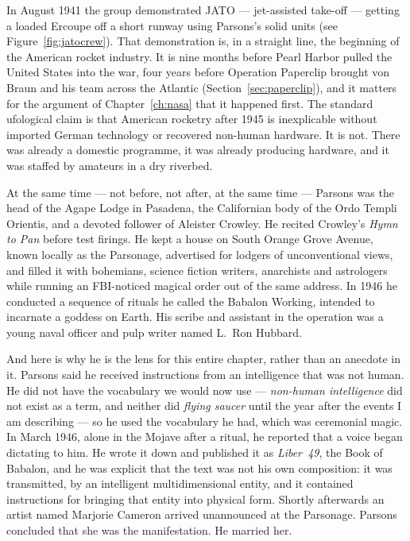 In August 1941 the group demonstrated JATO --- jet-assisted take-off --- getting a loaded Ercoupe
off a short runway using Parsons's solid units (see Figure~\ref{fig:jatocrew}). That demonstration is,
in a straight line, the beginning of the American rocket industry. It is nine months before Pearl
Harbor pulled the United States into the war, four years before Operation Paperclip brought von
Braun and his team across the Atlantic (Section~\ref{sec:paperclip}), and it matters for the argument
of Chapter~\ref{ch:nasa} that it happened first. The standard ufological claim is that American
rocketry after 1945 is inexplicable without imported German technology or recovered non-human
hardware. It is not. There was already a domestic programme, it was already producing hardware,
and it was staffed by amateurs in a dry riverbed.

At the same time --- not before, not after, at the same time --- Parsons was the head of the
Agape Lodge in Pasadena, the Californian body of the Ordo Templi Orientis, and a devoted follower
of Aleister Crowley. He recited Crowley's \emph{Hymn to Pan} before test firings. He kept a house
on South Orange Grove Avenue, known locally as the Parsonage, advertised for lodgers of
unconventional views, and filled it with bohemians, science fiction writers, anarchists and
astrologers while running an FBI-noticed magical order out of the same address. In 1946 he
conducted a sequence of rituals he called the Babalon Working, intended to incarnate a goddess
on Earth. His scribe and assistant in the operation was a young naval officer and pulp writer
named L.~Ron Hubbard.

And here is why he is the lens for this entire chapter, rather than an anecdote in it. Parsons
said he received instructions from an intelligence that was not human. He did not have the
vocabulary we would now use --- \emph{non-human intelligence} did not exist as a term, and neither
did \emph{flying saucer} until the year after the events I am describing --- so he used the
vocabulary he had, which was ceremonial magic. In March 1946, alone in the Mojave after a ritual,
he reported that a voice began dictating to him. He wrote it down and published it as
\emph{Liber~49}, the Book of Babalon, and he was explicit that the text was not his own
composition: it was transmitted, by an intelligent multidimensional entity, and it contained
instructions for bringing that entity into physical form. Shortly afterwards an artist named
Marjorie Cameron arrived unannounced at the Parsonage. Parsons concluded that she was the
manifestation. He married her.

